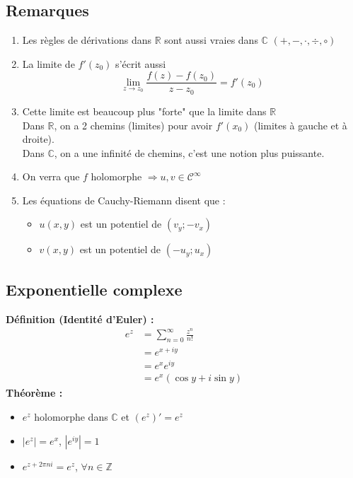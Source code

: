 \subsection{Remarques}
\begin{enumerate}
    \item Les règles de dérivations dans $\mathbb{R}$ sont aussi vraies dans $\mathbb{C}$ $(+,-,\cdot,\div,\circ)$
    \item La limite de $f'(z_0)$ s'écrit aussi
    $$\lim_{z\to z_0}\frac{f(z)-f(z_0)}{z-z_0}=f'(z_0)$$
    \item Cette limite est beaucoup plus "forte" que la limite dans $\mathbb{R}$\\
    Dans $\mathbb{R}$, on a 2 chemins (limites) pour avoir $f'(x_0)$ (limites à gauche et à droite).\\
    Dans $\mathbb{C}$, on a une infinité de chemins, c'est une notion plus puissante.
    \item On verra que $f$ holomorphe $\Rightarrow u,v\in\mathcal{C}^{\infty}$
    \item Les équations de Cauchy-Riemann disent que :
    \begin{itemize}
        \item $u(x,y)$ est un potentiel de $(v_y;-v_x)$
        \item $v(x,y)$ est un potentiel de $(-u_y;u_x)$
    \end{itemize}
\end{enumerate}

\subsection{Exponentielle complexe}
\textbf{Définition (Identité d'Euler) :}
\begin{align*}
    e^z &= \sum^\infty_{n=0}\frac{z^n}{n!}\\
    &= e^{x+iy}\\
    &= e^x e^{iy}\\
    &= e^x(\cos y + i\sin y)
\end{align*}
\textbf{Théorème :}
\begin{itemize}
    \item $e^z$ holomorphe dans $\mathbb{C}$ et $(e^z)' = e^z$
    \item $|e^z| = e^x$, $|e^{iy}|=1$
    \item $e^{z+2\pi ni} = e^z$, $\forall n \in \mathbb{Z}$
\end{itemize}

